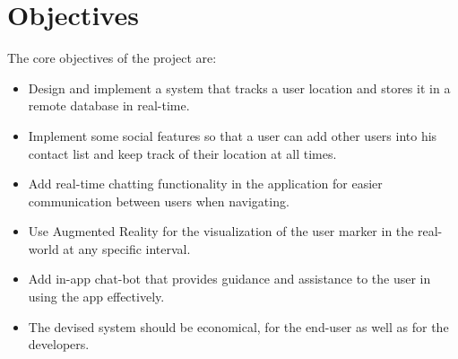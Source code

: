 \section{Objectives} \label{objectives}
The core objectives of the project are:
\begin{itemize}
    \item Design and implement a system that tracks a user location and stores it in a remote database in real-time.
    \item Implement some social features so that a user can add other users into his contact list and keep track of their location at all times.
    \item Add real-time chatting functionality in the application for easier communication between users when navigating.
    \item Use Augmented Reality for the visualization of the user marker in the real-world at any specific interval.
    \item Add in-app chat-bot that provides guidance and assistance to the user in using the app effectively.
    \item The devised system should be economical, for the end-user as well as for the developers.
\end{itemize}



